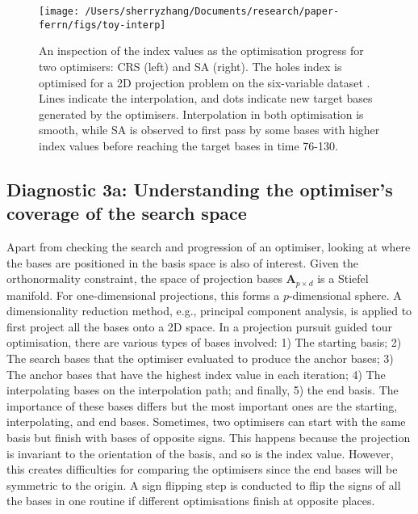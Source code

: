 \begin{Schunk}
\begin{figure}

{\centering \texttt{[image: /Users/sherryzhang/Documents/research/paper-ferrn/figs/toy-interp]} 

}

\caption[An inspection of the index values as the optimisation progress for two optimisers]{An inspection of the index values as the optimisation progress for two optimisers: CRS (left) and SA (right). The holes index is optimised for a 2D projection problem on the six-variable dataset . Lines indicate the interpolation, and dots indicate new target bases generated by the optimisers. Interpolation in both optimisation is smooth, while SA is observed to first pass by some bases with higher index values before reaching the target bases in time 76-130.}\label{fig:toy-interp}
\end{figure}
\end{Schunk}

\hypertarget{toy-pca}{%
\subsection{Diagnostic 3a: Understanding the optimiser's coverage of the
search space}\label{toy-pca}}

Apart from checking the search and progression of an optimiser, looking
at where the bases are positioned in the basis space is also of
interest. Given the orthonormality constraint, the space of projection
bases \(\mathbf{A}_{p \times d}\) is a Stiefel manifold. For
one-dimensional projections, this forms a \(p\)-dimensional sphere. A
dimensionality reduction method, e.g., principal component analysis, is
applied to first project all the bases onto a 2D space. In a projection
pursuit guided tour optimisation, there are various types of bases
involved: 1) The starting basis; 2) The search bases that the optimiser
evaluated to produce the anchor bases; 3) The anchor bases that have the
highest index value in each iteration; 4) The interpolating bases on the
interpolation path; and finally, 5) the end basis. The importance of
these bases differs but the most important ones are the starting,
interpolating, and end bases. Sometimes, two optimisers can start with
the same basis but finish with bases of opposite signs. This happens
because the projection is invariant to the orientation of the basis, and
so is the index value. However, this creates difficulties for comparing
the optimisers since the end bases will be symmetric to the origin. A
sign flipping step is conducted to flip the signs of all the bases in
one routine if different optimisations finish at opposite places.

